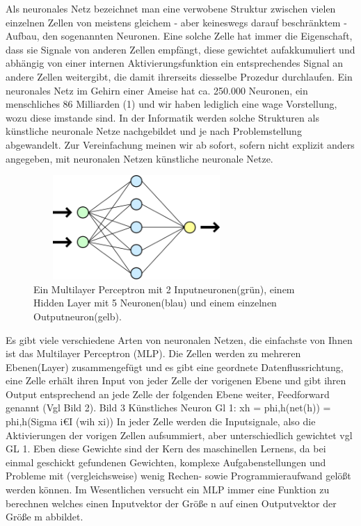 Als neuronales Netz bezeichnet man eine verwobene Struktur zwischen vielen einzelnen Zellen von meistens gleichem - aber keineswegs darauf beschr\"anktem - Aufbau, den sogenannten Neuronen. Eine solche Zelle hat immer die Eigenschaft, dass sie Signale von anderen Zellen empfängt, diese gewichtet aufakkumuliert und abhängig von einer internen Aktivierungsfunktion ein entsprechendes Signal an andere Zellen weitergibt, die damit ihrerseits diesselbe Prozedur durchlaufen. Ein neuronales Netz im Gehirn einer Ameise hat ca. 250.000 Neuronen, ein menschliches 86 Milliarden (1) und wir haben lediglich eine wage Vorstellung, wozu diese imstande sind. In der Informatik werden solche Strukturen als künstliche neuronale Netze nachgebildet und je nach Problemstellung abgewandelt. Zur Vereinfachung meinen wir ab sofort, sofern nicht explizit anders angegeben, mit neuronalen Netzen künstliche neuronale Netze.
\begin{figure}
	\centering
	\includegraphics[width=0.7\textwidth, height=150px]{pics/MLP.png}	
	\caption{Ein Multilayer Perceptron mit 2 Inputneuronen(grün), einem Hidden Layer mit 5 Neuronen(blau) und einem einzelnen Outputneuron(gelb).   \cite{bib:mlp}}
	\label{img:aneuron}
\end{figure}
Es gibt viele verschiedene Arten von neuronalen Netzen, die einfachste von Ihnen ist das Multilayer Perceptron (MLP). Die Zellen werden zu mehreren Ebenen(Layer) zusammengefügt und es gibt eine geordnete Datenflussrichtung, eine Zelle erhält ihren Input von jeder Zelle der vorigenen Ebene und gibt ihren Output entsprechend an jede Zelle der folgenden Ebene weiter, Feedforward genannt (Vgl Bild 2). 
Bild 3 Künstliches Neuron 
Gl 1: xh = phi,h(net(h)) = phi,h(Sigma i€I (wih xi))
In jeder Zelle werden die Inputsignale, also die Aktivierungen der vorigen Zellen aufsummiert, aber unterschiedlich gewichtet vgl GL 1. Eben diese Gewichte sind der Kern des maschinellen Lernens, da bei einmal geschickt gefundenen Gewichten, komplexe Aufgabenstellungen und Probleme mit (vergleichsweise) wenig Rechen- sowie Programmieraufwand gelößt werden können. Im Wesentlichen versucht ein MLP immer eine Funktion zu berechnen welches einen Inputvektor der Größe n auf einen Outputvektor der Größe m abbildet. 
